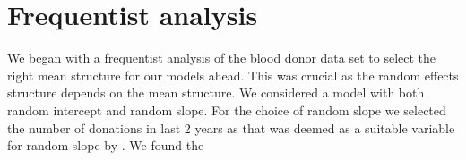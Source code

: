 \section{Frequentist analysis}
\label{sec : frequentist_blood_donor}
We began with a frequentist analysis of the blood donor data set to select the right mean structure for our models ahead. This was crucial as the random effects structure depends on the mean structure. We considered a model with both random intercept and random slope. For the choice of random slope we selected the number of donations in last 2 years as that was deemed as a suitable variable for random slope by \citet{nasserinejad_prevalence_2015}. We found the 